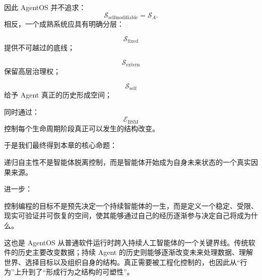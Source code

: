 因此 AgentOS 并不追求：
\[
\mathcal S_{\mathrm{selfmodifiable}}
=
\mathcal S_A.
\]
相反，一个成熟系统应具有明确分层：

\[
\boxed{
\mathcal S_{\mathrm{fixed}}
}
\]
提供不可越过的底线；

\[
\boxed{
\mathcal S_{\mathrm{extern}}
}
\]
保留高层治理权；

\[
\boxed{
\mathcal S_{\mathrm{self}}
}
\]
给予 Agent 真正的历史形成空间；

同时通过：
\[
\boxed{
\mathcal E_{\mathrm{BSM}}
}
\]
控制每个生命周期阶段真正可以发生的结构改变。

于是我们最终得到本章的核心命题：

\begin{proposition*}
递归自主性不是智能体脱离控制，而是智能体开始成为自身未来状态的一个真实因果来源。
\end{proposition*}

进一步：

\begin{statementbox}
控制编程的目标不是预先决定一个持续智能体的一生，而是定义一个稳定、受限、现实可验证并可恢复的空间，使其能够通过自己的经历逐渐参与决定自己将成为什么。
\end{statementbox}

这也是 AgentOS 从普通软件运行时跨入持续人工智能体的一个关键界线。传统软件的历史主要改变数据；持续 Agent 的历史则能够逐渐改变未来处理数据、理解世界、选择目标以及组织自身的结构。真正需要被工程化控制的，也因此从“行为”上升到了“形成行为之结构的可塑性”。
